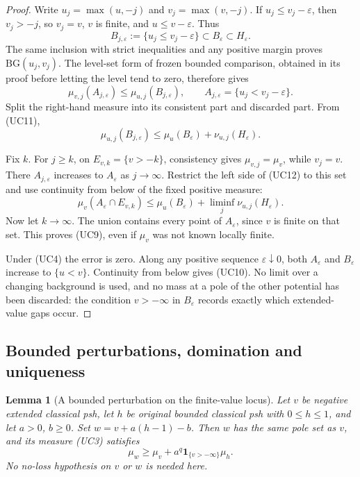 \documentclass[11pt,a4paper]{article}
\numberwithin{equation}{section}
\newtheorem{lemma}[theorem]{Lemma}
\theoremstyle{definition}
\theoremstyle{remark}
\begin{document}
\begin{proof}
Write $u_j=\max(u,-j)$ and $v_j=\max(v,-j)$. If
$u_j\leq v_j-\varepsilon$, then $v_j>-j$, so $v_j=v$,
$v$ is finite, and $u\leq v-\varepsilon$. Thus
\[
 B_{j,\varepsilon}:=\{u_j\leq v_j-\varepsilon\}
       \subset B_\varepsilon\subset H_\varepsilon.
 \tag{UC11}
\]
The same inclusion with strict inequalities and any positive
margin proves $\mathrm{BG}(u_j,v_j)$. The level-set form of
frozen bounded comparison, obtained in its proof before letting
the level tend to zero, therefore gives
\[
 \mu_{v,j}(A_{j,\varepsilon})
                  \leq\mu_{u,j}(B_{j,\varepsilon}),
 \qquad A_{j,\varepsilon}=\{u_j<v_j-\varepsilon\}.
 \tag{UC12}
\]
Split the right-hand measure into its consistent part and
discarded part. From (UC11),
\[
 \mu_{u,j}(B_{j,\varepsilon})
          \leq\mu_u(B_\varepsilon)
                           +\nu_{u,j}(H_\varepsilon).
 \tag{UC13}
\]

Fix $k$. For $j\geq k$, on $E_{v,k}=\{v>-k\}$,
consistency gives $\mu_{v,j}=\mu_v$, while $v_j=v$.
There $A_{j,\varepsilon}$ increases to $A_\varepsilon$ as
$j\to\infty$. Restrict the left side of (UC12) to this set
and use continuity from below of the fixed positive measure:
\[
 \mu_v(A_\varepsilon\cap E_{v,k})
 \leq\mu_u(B_\varepsilon)
                        +\liminf_j\nu_{u,j}(H_\varepsilon).
\]
Now let $k\to\infty$. The union contains every point of
$A_\varepsilon$, since $v$ is finite on that set. This proves
(UC9), even if $\mu_v$ was not known locally finite.

Under (UC4) the error is zero. Along any positive sequence
$\varepsilon\downarrow0$, both $A_\varepsilon$ and
$B_\varepsilon$ increase to $\{u<v\}$. Continuity from
below gives (UC10). No limit over a changing background is used,
and no mass at a pole of the other potential has been discarded:
the condition $v> -\infty$ in $B_\varepsilon$ records exactly
which extended-value gaps occur.
\end{proof}

\subsection{Bounded perturbations, domination and uniqueness}

\begin{lemma}[A bounded perturbation on the finite-value locus]
\label{lem:r11-unbounded-positive-perturbation}
Let $v$ be negative extended classical psh, let $h$ be original
bounded classical psh with $0\leq h\leq1$, and let
$a>0$, $b\geq0$. Set $w=v+a(h-1)-b$. Then $w$ has the
same pole set as $v$, and its measure (UC3) satisfies
\[
       \mu_w\geq\mu_v+
                 a^q\mathbf1_{\{v> -\infty\}}\mu_h.
 \tag{UC14}
\]
No no-loss hypothesis on $v$ or $w$ is needed here.
\end{lemma}
\end{document}
